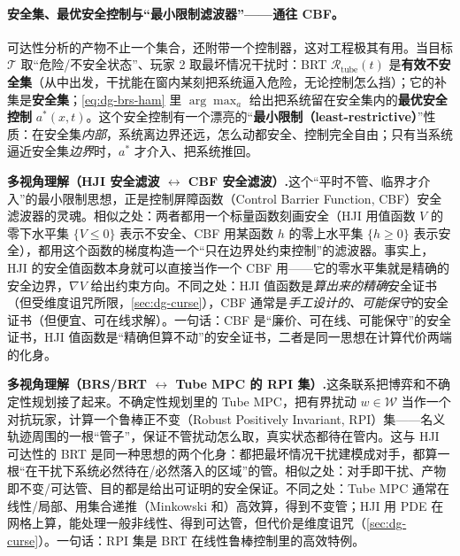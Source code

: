 \paragraph{安全集、最优安全控制与“最小限制滤波器”——通往 CBF。}
可达性分析的产物不止一个集合，还附带一个控制器，这对工程极其有用。当目标 $\mathcal{T}$ 取“危险/不安全状态”、玩家 2 取最坏情况干扰时：BRT $\mathcal{R}_{\text{tube}}(t)$ 是\textbf{有效不安全集}（从中出发，干扰能在窗内某刻把系统逼入危险，无论控制怎么挡）；它的补集是\textbf{安全集}；\cref{eq:dg-brs-ham} 里 $\arg\max_a$ 给出把系统留在安全集内的\textbf{最优安全控制} $a^*(x,t)$。这个安全控制有一个漂亮的“\textbf{最小限制（least-restrictive）}”性质：在安全集\emph{内部}，系统离边界还远，怎么动都安全、控制完全自由；只有当系统逼近安全集\emph{边界}时，$a^*$ 才介入、把系统推回。

\begin{note}
\textbf{多视角理解（HJI 安全滤波 $\leftrightarrow$ CBF 安全滤波）.}\;这个“平时不管、临界才介入”的最小限制思想，正是控制屏障函数（Control Barrier Function, CBF）安全滤波器的灵魂。相似之处：两者都用一个标量函数刻画安全（HJI 用值函数 $V$ 的零下水平集 $\{V\le0\}$ 表示不安全、CBF 用某函数 $h$ 的零上水平集 $\{h\ge0\}$ 表示安全），都用这个函数的梯度构造一个“只在边界处约束控制”的滤波器。事实上，HJI 的安全值函数本身就可以直接当作一个 CBF 用——它的零水平集就是精确的安全边界，$\nabla V$ 给出约束方向。不同之处：HJI 值函数是\emph{算出来的精确}安全证书（但受维度诅咒所限，\cref{sec:dg-curse}），CBF 通常是\emph{手工设计的、可能保守}的安全证书（但便宜、可在线求解）。一句话：CBF 是“廉价、可在线、可能保守”的安全证书，HJI 值函数是“精确但算不动”的安全证书，二者是同一思想在计算代价两端的化身。
\end{note}

\begin{note}
\textbf{多视角理解（BRS/BRT $\leftrightarrow$ Tube MPC 的 RPI 集）.}\;这条联系把博弈和不确定性规划接了起来。不确定性规划里的 Tube MPC，把有界扰动 $w\in\mathcal{W}$ 当作一个对抗玩家，计算一个鲁棒正不变（Robust Positively Invariant, RPI）集——名义轨迹周围的一根“管子”，保证不管扰动怎么取，真实状态都待在管内。这与 HJI 可达性的 BRT 是同一种思想的两个化身：都把最坏情况干扰建模成对手，都算一根“在干扰下系统必然待在/必然落入的区域”的管。相似之处：对手即干扰、产物即不变/可达管、目的都是给出可证明的安全保证。不同之处：Tube MPC 通常在线性/局部、用集合递推（Minkowski 和）高效算，得到不变管；HJI 用 PDE 在网格上算，能处理一般非线性、得到可达管，但代价是维度诅咒（\cref{sec:dg-curse}）。一句话：RPI 集是 BRT 在线性鲁棒控制里的高效特例。
\end{note}

